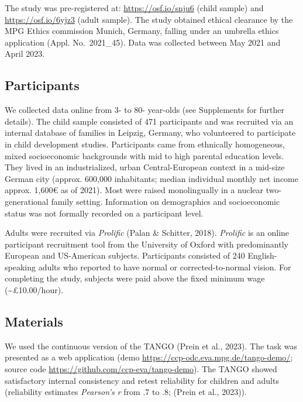 \documentclass[
  man,mask,floatsintext]{apa7}
\begin{document}
The study was pre-registered at: \url{https://osf.io/snju6} (child sample) and \url{https://osf.io/6yjz3} (adult sample). The study obtained ethical clearance by the MPG Ethics commission Munich, Germany, falling under an umbrella ethics application (Appl. No.~2021\_45). Data was collected between May 2021 and April 2023.

\hypertarget{participants}{%
\subsection{Participants}\label{participants}}

We collected data online from 3- to 80- year-olds (see Supplements for further details). The child sample consisted of 471 participants and was recruited via an internal database of families in Leipzig, Germany, who volunteered to participate in child development studies. Participants came from ethnically homogeneous, mixed socioeconomic backgrounds with mid to high parental education levels. They lived in an industrialized, urban Central-European context in a mid-size German city (approx. 600,000 inhabitants; median individual monthly net income approx. 1,600€ as of 2021). Most were raised monolingually in a nuclear two-generational family setting. Information on demographics and socioeconomic status was not formally recorded on a participant level.

Adults were recruited via \emph{Prolific} (Palan \& Schitter, 2018). \emph{Prolific} is an online participant recruitment tool from the University of Oxford with predominantly European and US-American subjects. Participants consisted of 240 English-speaking adults who reported to have normal or corrected-to-normal vision. For completing the study, subjects were paid above the fixed minimum wage (\textasciitilde£10.00/hour).

\hypertarget{materials}{%
\subsection{Materials}\label{materials}}

We used the continuous version of the TANGO (Prein et al., 2023). The task was presented as a web application (demo \href{https://ccp-odc.eva.mpg.de/tango-demo/.}{https://ccp-odc.eva.mpg.de/tango-demo/}; source code \url{https://github.com/ccp-eva/tango-demo}). The TANGO showed satisfactory internal consistency and retest reliability for children and adults (reliability estimates \emph{Pearson's r} from .7 to .8; (Prein et al., 2023)).
\end{document}
